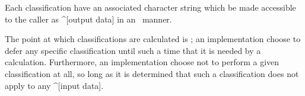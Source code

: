 Each classification \shall have an associated character string
 which \shall be made accessible to the caller
as ^[output data] in an \unspecified\ manner.

The point at which classifications are calculated is \unspecified; an
implementation \may choose to defer any specific classification until such a
time that it is needed by a calculation. Furthermore, an implementation \may
choose not to perform a given classification at all, so long as it is determined
that such a classification does not apply to any ^[input data].


\dataclassout


